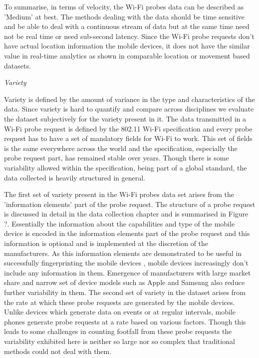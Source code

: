 To summarise, in terms of velocity, the Wi-Fi probes data can be described as 'Medium' at best. 
The methods dealing with the data should be time sensitive and be able to deal with a continuous stream of data but at the same time need not be real time or need sub-second latency.
Since the Wi-Fi probe requests don't have actual location information the mobile devices, it does not have the similar value in real-time analytics as shown in comparable location or movement based datasets.


\vspace{1.5em}\noindent\textit{Variety}\vspace{0.5em}

Variety is defined by the amount of variance in the type and characteristics of the data.
Since variety is hard to quantify and compare across disciplines we evaluate the dataset subjectively for the variety present in it.
The data transmitted in a Wi-Fi probe request is defined by the 802.11 Wi-Fi specification \cite{ieee2016} and every probe request has to have a set of mandatory fields for Wi-Fi to work.
This set of fields is the same everywhere across the world and the specification, especially the probe request part, has remained stable over years.
Though there is some variability allowed within the specification, being part of a global standard, the data collected is heavily structured in general.

The first set of variety present in the Wi-Fi probes data set arises from the 'information elements' part of the probe request.
The structure of a probe request is discussed in detail in the data collection chapter and is summarised in Figure ?.
Essentially the information about the capabilities and type of the mobile device is encoded in the information elements part of the probe request and this information is optional and is implemented at the discretion of the manufacturers.
As this information elements are demonstrated to be useful in successfully fingerprinting the mobile devices \cite{vanhoef2016}, mobile devices increasingly don't include any information in them.
Emergence of manufacturers with large market share and narrow set of device models such as Apple and Samsung also reduce further variability in them.
The second set of variety in the dataset arises from the rate at which these probe requests are generated by the mobile devices. 
Unlike devices which generate data on events or at regular intervals, mobile phones generate probe requests at a rate based on various factors.
Though this leads to some challenges in counting footfall from these probe requests the variability exhibited here is neither so large nor so complex that traditional methods could not deal with them.

